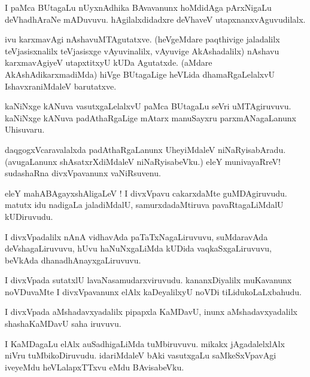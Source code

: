 \documentclass{article}
\begin{document}
\begin{mn}
I paMca BUtagaLu nUyxnAdhika BAvavanunx hoMdidAga pArxNigaLu 
deVhadhAraNe mADuvuvu. hAgilalxdidadxre deVhaveV utapxnanxvAguvudilalx.
\end{mn}

\begin{mn}
ivu karxmavAgi nAshavuMTAgutatxve. (heVgeMdare paqthivige jaladalilx 
teVjasisxnalilx teVjasisxge vAyuvinalilx, vAyuvige AkAshadalilx) 
nAshavu karxmavAgiyeV utapxtitxyU kUDa Agutatxde. (aMdare AkAshAdikarxmadiMda) 
hiVge BUtagaLige heVLida dhamaRgaLelalxvU IshavxraniMdaleV barutatxve.
\end{mn}

\begin{mn}
kaNiNxge kANuva vasutxgaLelalxvU paMca BUtagaLu seVri uMTAgiruvuvu. 
kaNiNxge kANuva padAthaRgaLige mAtarx manuSayxru parxmANagaLanunx Uhisuvaru.
\end{mn}

\begin{mn}
daqgogxVcaravalalxda padAthaRgaLanunx UheyiMdaleV niNaRyisabAradu. 
(avugaLanunx shAsatxrXdiMdaleV niNaRyisabeVku.) 
eleY munivayaRreV! sudashaRna divxVpavanunx vaNiRsuvenu.
\end{mn}

\begin{mn}
eleY mahABAgayxshAligaLeV !  I divxVpavu cakarxdaMte guMDAgiruvudu. 
matutx idu nadigaLa jaladiMdalU, samurxdadaMtiruva pavaRtagaLiMdalU kUDiruvudu.
\end{mn}

\begin{mn}
I divxVpadalilx nAnA vidhavAda paTaTxNagaLiruvuvu, suMdaravAda deVshagaLiruvuvu, 
hUvu haNuNxgaLiMda kUDida vaqkaSxgaLiruvuvu, beVkAda dhanadhAnayxgaLiruvuvu.
\end{mn}

\begin{mn}
I divxVpada sutatxlU lavaNasamudarxviruvudu. 
kananxDiyalilx  muKavanunx noVDuvaMte I divxVpavanunx elAlx 
kaDeyalilxyU noVDi tiLidukoLaLxbahudu.
\end{mn}

\begin{mn}
I divxVpada aMshadavxyadalilx pipapxla KaMDavU, 
inunx aMshadavxyadalilx shashaKaMDavU saha iruvuvu.
\end{mn}

\begin{mn}
I KaMDagaLu elAlx auSadhigaLiMda tuMbiruvuvu. 
mikakx jAgadalelxlAlx niVru tuMbikoDiruvudu. idariMdaleV bAki vasutxgaLu 
saMkeSxVpavAgi iveyeMdu heVLalapxTTxvu eMdu BAvisabeVku.
\end{mn}
\end{document}
